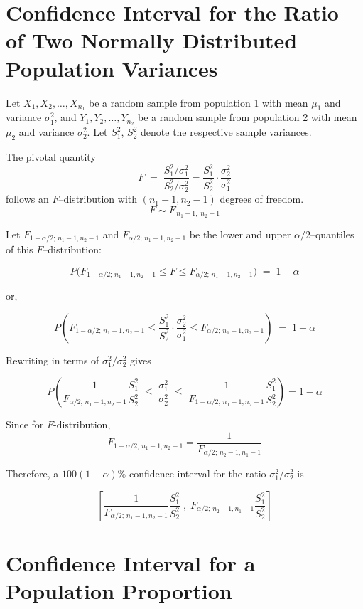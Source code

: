 \documentclass[twoside]{book}
\begin{document}
\section{Confidence Interval for the Ratio of Two Normally Distributed Population Variances}

Let \(X_1, X_2, \dots, X_{n_1}\) be a random sample from population 1 with mean \(\mu_1\) and variance \(\sigma_1^2\), and \(Y_1, Y_2, \dots, Y_{n_2}\) be a random sample from population 2 with mean \(\mu_2\) and variance \(\sigma_2^2\). Let \(S_1^2\), \(S_2^2\) denote the respective sample variances.

The pivotal quantity
\[
F \;=\;
\dfrac{S_1^2/\sigma_1^2}{S_2^2/\sigma_2^2} = \dfrac{S_1^2}{S_2^2}\cdot \dfrac{\sigma_2^2}{\sigma_1^2}
\]
follows an $F$–distribution with $(n_1-1,n_2-1)$ degrees of freedom.
\[
F \sim F_{\,n_1-1,\;n_2-1}
\]

Let $F_{1-\alpha/2;\,n_1-1,n_2-1}$ and $F_{\alpha/2;\,n_1-1,n_2-1}$ be the lower and upper $\alpha/2$–quantiles of this $F$–distribution:

\[
P\bigl(F_{1-\alpha/2;\,n_1-1,n_2-1}\le F\le F_{\alpha/2;\,n_1-1,n_2-1}\bigr) \;=\; 1-\alpha
\]

or,

\[
P\left( F_{1-\alpha/2;\,n_1-1,n_2-1}\le \dfrac{S_1^2}{S_2^2}\cdot \dfrac{\sigma_2^2}{\sigma_1^2} \leq F_{\alpha/2;\,n_1-1,n_2-1} \right) \;=\; 1-\alpha
\]

Rewriting in terms of $\sigma_1^2/\sigma_2^2$ gives

\[
P\left(
\frac{1}{F_{\alpha/2;\,n_1-1,n_2-1}}\frac{S_1^2}{S_2^2}
\;\le\;
\frac{\sigma_1^2}{\sigma_2^2}
\;\le\;
\frac{1}{F_{1-\alpha/2;\,n_1-1,n_2-1}}\frac{S_1^2}{S_2^2}
\right)
=1-\alpha
\]

Since for $ F $-distribution,
$$F_{1-\alpha/2;\,n_1-1,n_2-1} = \dfrac{1}{F_{\alpha/2;\,n_2-1,n_1-1}}$$

Therefore, a $100(1-\alpha)\%$ confidence interval for the ratio $\sigma_1^2/\sigma_2^2$ is

\begin{textbox}
	\[
	\left[
	\frac{1}{F_{\alpha/2;\,n_1-1,n_2-1}}\frac{S_1^2}{S_2^2}
	\;,\;
	{F_{\alpha/2;\,n_2-1,n_1-1}}\frac{S_1^2}{S_2^2}
	\right]
	\]
\end{textbox}


\section{Confidence Interval for a Population Proportion}
\end{document}
